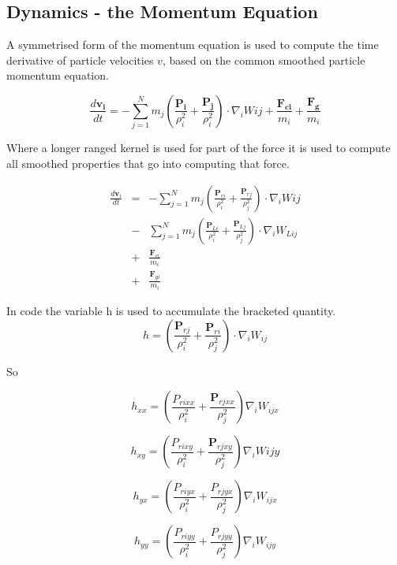 
\subsection{Dynamics - the Momentum Equation}
A symmetrised form of the momentum equation is used to compute the time
derivative of particle velocities $v$, based on the common smoothed particle
momentum equation.

\begin{equation}
\label{sph_momentum}
\frac{d \mathbold{ v_{i}} }{dt} = - \sum^{N}_{j=1}  
m_j \left( \frac{\mathbold{P_{i}}}{\rho^{2}_{i}} 
+ \frac{\mathbold{ P_{j}} }{\rho^{2}_{i}} \right) \cdot \nabla_i W{ij} 
+ \frac{\mathbold{F_{ci}}}{m_{i}} + \frac{\mathbold{F_{g}}}{m_{i}}
\end{equation}

Where a longer ranged kernel is used for part of the force it is used to
compute all smoothed properties that go into computing that force.

\begin{eqnarray}
\label{sph_momentum_seperated}
\frac{d \mathbold{v}_{i} }{dt} &=& - \sum^{N}_{j=1}  
m_j \left( \frac{\mathbold{P}_{ri}}{\rho^{2}_{i}} 
+ \frac{\mathbold{P}_{rj} }{\rho^{2}_{j}} \right) \cdot \nabla_i W{ij}  \\
&-& \sum^{N}_{j=1}  m_j \left( \frac{\mathbold{P}_{Li}}{\rho^{2}_{i}} 
+ \frac{\mathbold{P}_{Lj}}{\rho^{2}_{j}} \right) \cdot \nabla_i W_{Lij}  \\
&+& \frac{\mathbold{F}_{ci}}{m_{i}} \\
&+& \frac{\mathbold{F}_{gi}}{m_{i}}
\end{eqnarray}

In code the variable h is used to accumulate the bracketed quantity.
\[
h  = \left( \frac{\mathbold{P}_{rj}}{\rho^{2}_{i}} 
   + \frac{\mathbold{P}_{ri} }{\rho^{2}_{j}} \right) \cdot \nabla_i W_{ij} 
\]

So

\[
h_{xx} = \left( \frac{P_{rixx}}{\rho^{2}_{i}} 
   + \frac{\mathbold{P}_{rjxx} }{\rho^{2}_{j}} \right) \nabla_{i} W_{ijx} 
\]   
   
\[
h_{xy} = \left( \frac{P_{rixy}}{\rho^{2}_{i}} 
   + \frac{\mathbold{P}_{rjxy} }{\rho^{2}_{j}} \right) \nabla_{i} W{ijy}   
\]

\[
h_{yx} = \left( \frac{P_{riyx}}{\rho^{2}_{i}} 
   + \frac{P_{rjyx} }{\rho^{2}_{j}} \right) \nabla_i W_{ijx} 
\]

\[
h_{yy} = \left( \frac{P_{riyy}}{\rho^{2}_{i}} 
   + \frac{P_{rjyy} }{\rho^{2}_{j}} \right) \nabla_i W_{ijy} 
\]


